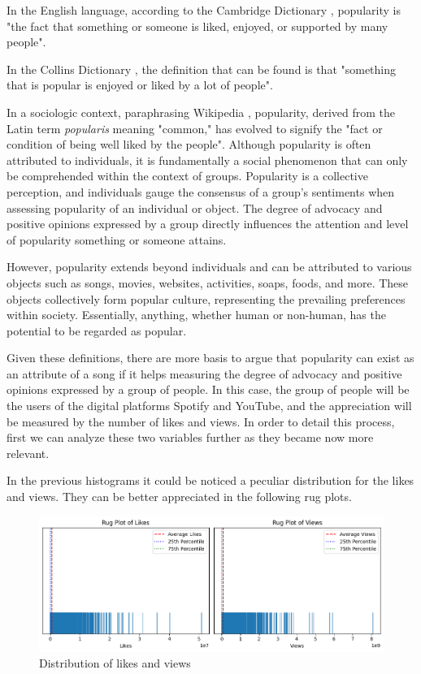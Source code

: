 \documentclass[11pt]{article} %
\begin{document}
In the English language, according to the Cambridge Dictionary \cite{CambridgeDictionary}, popularity is "the fact that something or someone is liked, enjoyed, or supported by many people".

In the Collins Dictionary \cite{CollinsDisctionary}, the definition that can be found is that "something that is popular is enjoyed or liked by a lot of people".

In a sociologic context, paraphrasing Wikipedia \cite{WikipediaPopularity}, popularity, derived from the Latin term \textit{popularis} meaning "common," has evolved to signify the "fact or condition of being well liked by the people". Although popularity is often attributed to individuals, it is fundamentally a social phenomenon that can only be comprehended within the context of groups. Popularity is a collective perception, and individuals gauge the consensus of a group's sentiments when assessing popularity of an individual or object. The degree of advocacy and positive opinions expressed by a group directly influences the attention and level of popularity something or someone attains.

However, popularity extends beyond individuals and can be attributed to various objects such as songs, movies, websites, activities, soaps, foods, and more. These objects collectively form popular culture, representing the prevailing preferences within society. Essentially, anything, whether human or non-human, has the potential to be regarded as popular.

Given these definitions, there are more basis to argue that popularity can exist as an attribute of a song if it helps measuring the degree of advocacy and positive opinions expressed by a group of people. In this case, the group of people will be the users of the digital platforms Spotify and YouTube, and the appreciation will be measured by the number of likes and views.
In order to detail this process, first we can analyze these two variables further as they became now more relevant.

In the previous histograms it could be noticed a peculiar distribution for the likes and views. They can be better appreciated in the following rug plots.

\begin{figure}[ht]
	\centering
	\includegraphics[width=.8\linewidth]{rug_plots_views_likes.png}
	\caption{Distribution of likes and views}\label{fig:rug_plots_views_likes}
\end{figure}
\end{document}
